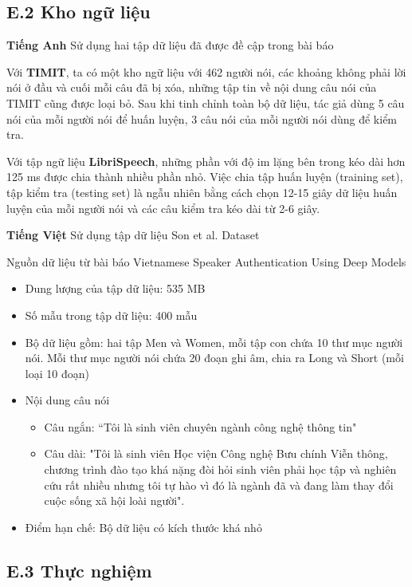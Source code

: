 \documentclass{article}
\begin{document}
	\subsection{E.2 Kho ngữ liệu}
	\qquad \textbf{Tiếng Anh} Sử dụng hai tập dữ liệu đã được đề cập trong bài báo
	
	Với \textbf{TIMIT}, ta có một kho ngữ liệu với 462 người nói, các khoảng không phải lời nói ở đầu và cuối mỗi câu đã bị xóa, những tập tin về nội dung câu nói của TIMIT cũng được loại bỏ. Sau khi tinh chỉnh toàn bộ dữ liệu, tác giả dùng 5 câu nói của mỗi người nói để huấn luyện, 3 câu nói của mỗi người nói dùng để kiểm tra.
	
	Với tập ngữ liệu \textbf{LibriSpeech}, những phần với độ im lặng bên trong kéo dài hơn 125 ms được chia thành nhiều phần nhỏ. Việc chia tập huấn luyện (training set), tập kiểm tra (testing set) là ngẫu nhiên bằng cách chọn 12-15 giây dữ liệu huấn luyện của mỗi người nói và các câu kiểm tra kéo dài từ 2-6 giây. 
	
	\textbf{Tiếng Việt} Sử dụng tập dữ liệu Son et al. Dataset
	
	Nguồn dữ liệu từ bài báo Vietnamese Speaker Authentication Using Deep Models
	\begin{itemize}
		\item Dung lượng của tập dữ liệu: 535 MB
		\item Số mẫu trong tập dữ liệu: 400 mẫu
		\item Bộ dữ liệu gồm: hai tập  Men và Women, mỗi tập con chứa 10 thư mục người nói. Mỗi thư mục người nói chứa 20 đoạn ghi âm, chia ra Long và Short (mỗi loại 10 đoạn) 
		\item Nội dung câu nói
		\begin{itemize}
			\item Câu ngắn: “Tôi là sinh viên chuyên ngành công nghệ thông tin"
			\item Câu dài: "Tôi là sinh viên Học viện Công nghệ Bưu chính Viễn thông, chương trình đào tạo khá nặng đòi hỏi sinh viên phải học tập và nghiên cứu rất nhiều nhưng tôi tự hào vì đó là ngành đã và đang làm thay đổi cuộc sống xã hội loài người".
		\end{itemize}
		\item Điểm hạn chế: Bộ dữ liệu có kích thước khá nhỏ
	\end{itemize}
	\subsection{E.3 Thực nghiệm}
\end{document}
